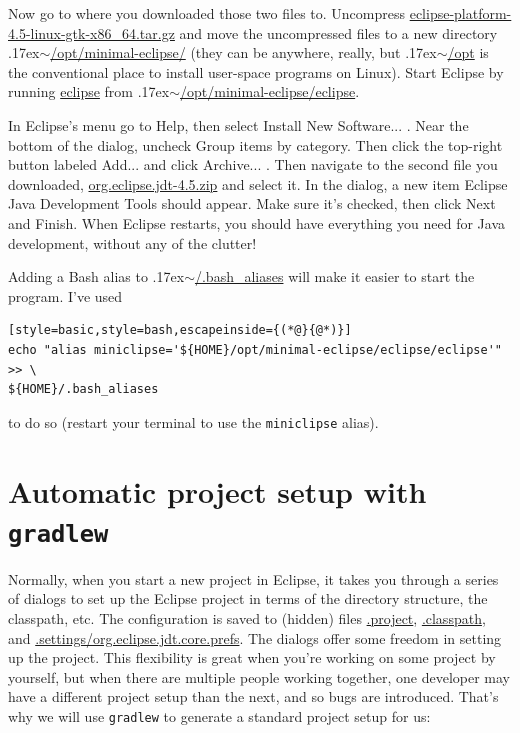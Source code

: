 \documentclass[12pt, a4paper, twoside, openany, titlepage]{book}
\newcommand{\mytilde}{\raise.17ex\hbox{$\scriptstyle\sim$}}
\begin{document}
Now go to where you downloaded those two files to. Uncompress \url{eclipse-platform-4.5-linux-gtk-x86_64.tar.gz} and move the uncompressed files to a new directory \mytilde\url{/opt/minimal-eclipse/} (they can be anywhere, really, but \mytilde\url{/opt} is the conventional place to install user-space programs on Linux). Start Eclipse by running \url{eclipse} from \mytilde\url{/opt/minimal-eclipse/eclipse}.

In Eclipse's menu go to \textsf{Help}, then select \textsf{Install New Software...} . Near the bottom of the dialog, uncheck \textsf{Group items by category}. Then click the top-right button labeled \textsf{Add...} and click \textsf{Archive...} . Then navigate to the second file you downloaded, \url{org.eclipse.jdt-4.5.zip} and select it. In the dialog, a new item \textsf{Eclipse Java Development Tools} should appear. Make sure it's checked, then click \textsf{Next} and \textsf{Finish}. When Eclipse restarts, you should have everything you need for Java development, without any of the clutter!


Adding a Bash alias to \mytilde\url{/.bash_aliases} will make it easier to start the program. I've used
\begin{lstlisting}[style=basic,style=bash,escapeinside={(*@}{@*)}]
echo "alias miniclipse='${HOME}/opt/minimal-eclipse/eclipse/eclipse'" >> \
${HOME}/.bash_aliases
\end{lstlisting}
to do so (restart your terminal to use the \texttt{miniclipse} alias).

\section{Automatic project setup with \texttt{gradlew}}


Normally, when you start a new project in Eclipse, it takes you through a series of dialogs to set up the Eclipse project in terms of the directory structure, the classpath, etc. The configuration is saved to (hidden) files \url{.project}, \url{.classpath}, and \url{.settings/org.eclipse.jdt.core.prefs}. The dialogs offer some freedom in setting up the project. This flexibility is great when you're working on some project by yourself, but when there are multiple people working together, one developer may have a different project setup than the next, and so bugs are introduced. That's why we will use \texttt{gradlew} to generate a standard project setup for us:
\end{document}
